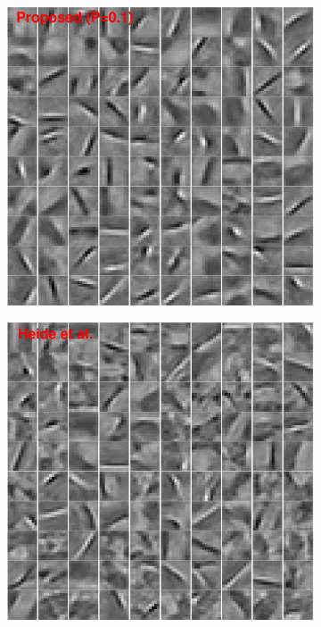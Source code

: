 \begin{figure}[h]
\begin{subfigure}{0.23\textwidth}
  \includegraphics[width=1\linewidth]{figure/batchFruit100.pdf}
\end{subfigure}
\begin{subfigure}{0.23\textwidth}
  \includegraphics[width=1\linewidth]{figure/heideFruit100.pdf}

\end{subfigure}
\end{figure}
